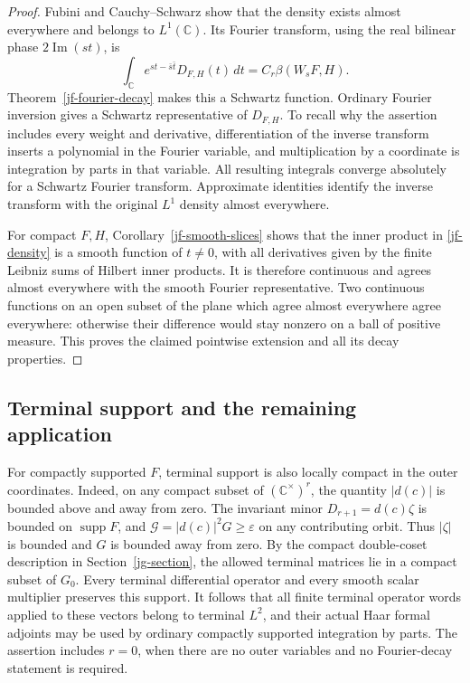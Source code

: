 \begin{proof}
Fubini and Cauchy--Schwarz show that the density exists
almost everywhere and belongs to \(L^1(\mathbb C)\).
Its Fourier transform, using the real bilinear phase
\(2\operatorname{Im}(st)\), is
\[
 \int_{\mathbb C}e^{st-\bar s\bar t}D_{F,H}(t)\,dt
                             =C_r\beta(W_sF,H).
\]
Theorem~\ref{jf-fourier-decay} makes this a Schwartz
function.  Ordinary Fourier inversion gives a Schwartz
representative of \(D_{F,H}\).  To recall why the assertion
includes every weight and derivative, differentiation of
the inverse transform inserts a polynomial in the Fourier
variable, and multiplication by a coordinate is integration
by parts in that variable.  All resulting integrals converge
absolutely for a Schwartz Fourier transform.  Approximate
identities identify the inverse transform with the original
\(L^1\) density almost everywhere.

For compact \(F,H\), Corollary~\ref{jf-smooth-slices}
shows that the inner product in \eqref{jf-density} is a
smooth function of \(t\ne0\), with all derivatives given
by the finite Leibniz sums of Hilbert inner products.
It is therefore continuous and agrees almost everywhere
with the smooth Fourier representative.  Two continuous
functions on an open subset of the plane which agree almost
everywhere agree everywhere: otherwise their difference
would stay nonzero on a ball of positive measure.
This proves the claimed pointwise extension and all its
decay properties.
\end{proof}

\subsection{Terminal support and the remaining application}

For compactly supported \(F\), terminal support is also
locally compact in the outer coordinates.  Indeed, on any
compact subset of \((\mathbb C^\times)^r\), the quantity
\(|d(c)|\) is bounded above and away from zero.  The invariant
minor \(D_{r+1}=d(c)\zeta\) is bounded on
\(\operatorname{supp}F\), and
\(\mathcal G=|d(c)|^2G\geq\varepsilon\) on any contributing
orbit.  Thus \(|\zeta|\) is bounded and \(G\) is bounded
away from zero.  By the compact double-coset description
in Section~\ref{jg-section}, the allowed terminal matrices
lie in a compact subset of \(G_0\).  Every terminal
differential operator and every smooth scalar multiplier
preserves this support.  It follows that all finite terminal
operator words applied to these vectors belong to terminal
\(L^2\), and their actual Haar formal adjoints may be used
by ordinary compactly supported integration by parts.
The assertion includes \(r=0\), when there are no outer
variables and no Fourier-decay statement is required.

